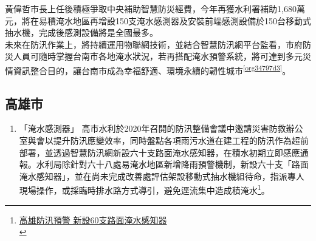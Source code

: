 \documentclass[a4paper,12pt]{article}
\begin{document}
\begin{enumerate}
黃偉哲市長上任後積極爭取中央補助智慧防災經費，今年再獲水利署補助1,680萬元，將在易積淹水地區再增設150支淹水感測器及安裝前端感測設備於150台移動式抽水機，完成後感測設備將是全國最多。\\

未來在防汛作業上，將持續運用物聯網技術，並結合智慧防汛網平台監看，市府防災人員可隨時掌握台南市各地淹水狀況，若再搭配淹水預警系統，將可達到多元災情資訊整合目的，讓台南市成為幸福舒適、環境永續的韌性城市\textsuperscript{\ref{org34797d3}}。\\
\end{enumerate}

\subsection{高雄市}
\label{sec:org828b4ba}
\begin{enumerate}
\item 「淹水感測器」
\label{sec:org728afd7}
高市水利於2020年召開的防汛整備會議中邀請災害防救辦公室與會以提升防汛應變效率，同時盤點各項雨污水道在建工程的防汛作為超前部署，並透過智慧防汛網新設六十支路面淹水感知器，在積水初期立即感應通報。水利局除針對六十八處易淹水地區新增降雨預警機制，新設六十支「路面淹水感知器」，並在尚未完成改善處評估架設移動式抽水機組待命，指派專人現場操作，或採臨時排水路方式導引，避免逕流集中造成積淹水\footnote{\href{https://news.ltn.com.tw/news/life/paper/1366448}{高雄防汛預警 新設60支路面淹水感知器}\\}。\\


\end{enumerate}
\end{document}

